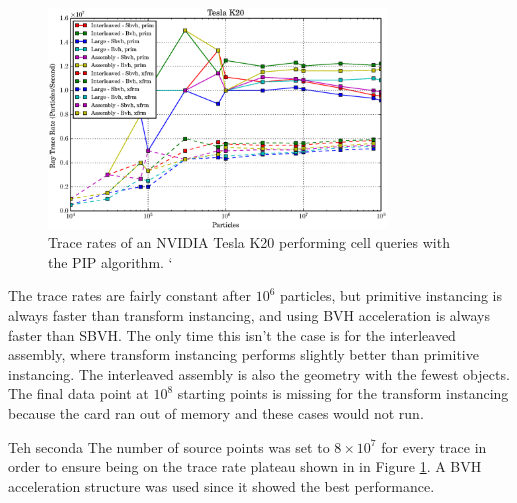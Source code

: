 \begin{figure}[h!] 
  \centering
    \includegraphics[width=0.8\textwidth]{graphics/prelim_optix_k20.eps}
     \caption{Trace rates of an NVIDIA Tesla K20 performing cell queries with the PIP algorithm. `\label{prelim_optix_k20} }
\end{figure}

The trace rates are fairly constant after $10^6$ particles, but primitive instancing is always faster than transform instancing, and using BVH acceleration is always faster than SBVH.  The only time this isn't the case is for the interleaved assembly, where transform instancing performs slightly better than primitive instancing.  The interleaved assembly is also the geometry with the fewest objects.  The final data point at $10^8$ starting points is missing for the transform instancing because the card ran out of memory and these cases would not run.




Teh seconda 
The number of source points was set to $8\times10^7$ for every trace in order to ensure being on the trace rate plateau shown in in Figure \ref{prelim_optix_k20}.  A BVH acceleration structure was used since it showed the best performance.

